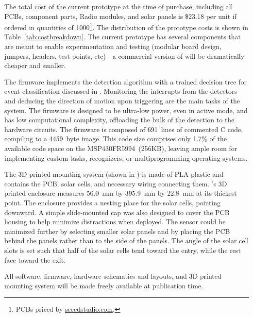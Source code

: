 The total cost of the current prototype at the time of purchase, including all PCBs, component parts, Radio modules, and solar panels is \$23.18 per unit if ordered in quantities of 1000\footnote{PCBs priced by \url{seeedstudio.com}.}.
The distribution of the prototype costs is shown in Table~\ref{tab:costbreakdown}.
The current prototype has several components that are meant to enable experimentation and testing (modular board design, jumpers, headers, test points, etc)---a commercial version of \sysname will be dramatically cheaper and smaller.



The \sysname firmware implements the detection algorithm with a trained decision tree for event classification discussed in .
Monitoring the interrupts from the detectors and deducing the direction of motion upon triggering are the main tasks of the system.
The firmware is designed to be ultra-low power, even in active mode, and has low computational complexity, offloading the bulk of the detection to the hardware circuits.
The \sysname firmware is composed of 691~lines of commented C code, compiling to a 4459~byte image. This code size comprises only 1.7\% of the available code space on the MSP430FR5994~(256KB), leaving ample room for implementing custom tasks, recognizers, or multiprogramming operating systems.

The 3D printed mounting system (shown in ) is made of PLA plastic and contains the PCB, solar cells, and necessary wiring connecting them.
\sysname's 3D printed enclosure measures \SI{56.0}{\milli\meter} by \SI{395.9}{\milli\meter} by \SI{22.8}{\milli\meter} at its thickest point. The enclosure provides a nesting place for the solar cells, pointing downward. 
A simple slide-mounted cap was also designed to cover the PCB housing to help minimize distractions when deployed.  The sensor could be minimized further by selecting smaller solar panels and by placing the PCB behind the panels rather than to the side of the panels.
The angle of the solar cell slots is set such that half of the solar cells tend toward the entry, while the rest face toward the exit.

All software, firmware, hardware schematics and layouts, and 3D printed mounting system will be made freely available at publication time.
